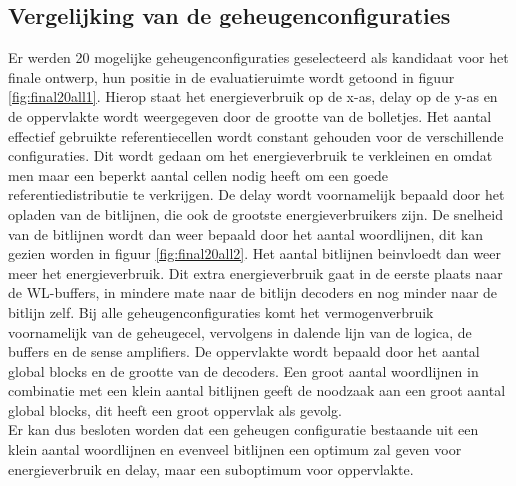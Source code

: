 \subsection{Vergelijking van de geheugenconfiguraties}
Er werden 20 mogelijke geheugenconfiguraties geselecteerd als kandidaat voor het finale ontwerp, hun positie in de evaluatieruimte wordt getoond in figuur \ref{fig:final20all1}. Hierop staat het energieverbruik op de x-as, delay op de y-as en de oppervlakte wordt weergegeven door de grootte van de bolletjes. Het aantal effectief gebruikte referentiecellen wordt constant gehouden voor de verschillende configuraties. Dit wordt gedaan om het energieverbruik te verkleinen en omdat men maar een beperkt aantal cellen nodig heeft om een goede referentiedistributie te verkrijgen. De delay wordt voornamelijk bepaald door het opladen van de bitlijnen, die ook de grootste energieverbruikers zijn. De snelheid van de bitlijnen wordt dan weer bepaald door het aantal woordlijnen, dit kan gezien worden in figuur \ref{fig:final20all2}. Het aantal bitlijnen beinvloedt dan weer meer het energieverbruik. Dit extra energieverbruik gaat in de eerste plaats naar de WL-buffers, in mindere mate naar de bitlijn decoders en nog minder naar de bitlijn zelf. Bij alle geheugenconfiguraties komt het vermogenverbruik voornamelijk van de geheugecel, vervolgens in dalende lijn van de logica, de buffers en de sense amplifiers. De oppervlakte wordt bepaald door het aantal global blocks en de grootte van de decoders. Een groot aantal woordlijnen in combinatie met een klein aantal bitlijnen geeft de noodzaak aan een groot aantal global blocks, dit heeft een groot oppervlak als gevolg.\\
Er kan dus besloten worden dat een geheugen configuratie bestaande uit een klein aantal woordlijnen en evenveel bitlijnen een optimum zal geven voor energieverbruik en delay, maar een suboptimum voor oppervlakte.


